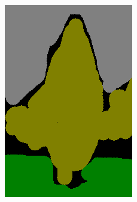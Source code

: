 \documentclass{article} %
\begin{document}
\begin{figure}
\begin{subfigure}[c]{\textwidth}
\begin{subfigure}[c]{0.195\textwidth}
			\includegraphics[width = \textwidth]{./img/2_21_s_GT.png}
			\label{fig:2_21_s_lab}
		\end{subfigure}
		\begin{subfigure}[c]{0.195\textwidth}

\end{subfigure}
\end{subfigure}
\end{figure}
\end{document}
